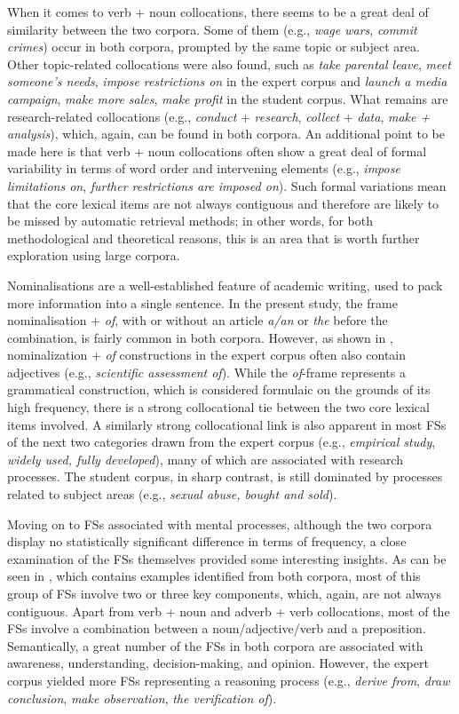 \documentclass[output=paper]{langsci/langscibook}
\begin{document}
When it comes to verb + noun collocations, there seems to be a great deal of similarity between the two corpora. Some of them (e.g., \textit{wage wars}, \textit{commit crimes}) occur in both corpora, prompted by the same topic or subject area. Other topic-related collocations were also found, such as \textit{take parental leave}, \textit{meet someone’s needs}, \textit{impose restrictions on} in the expert corpus and \textit{launch a media campaign}, \textit{make more sales}, \textit{make profit} in the student corpus. What remains are research-related collocations (e.g., \textit{conduct} + \textit{research}, \textit{collect} + \textit{data}, \textit{make + analysis}), which, again, can be found in both corpora. An additional point to be made here is that verb + noun collocations often show a great deal of formal variability in terms of word order and intervening elements (e.g., \textit{impose limitations on}, \textit{further restrictions are imposed on}). Such formal variations mean that the core lexical items are not always contiguous and therefore are likely to be missed by automatic retrieval methods; in other words, for both methodological and theoretical reasons, this is an area that is worth further exploration using large corpora. 

Nominalisations are a well-established feature of academic writing, used to pack more information into a single sentence. In the present study, the frame nominalisation + \textit{of}, with or without an article \textit{a/an} or \textit{the} before the combination, is fairly common in both corpora. However, as shown in , nominalization + \textit{of} constructions in the expert corpus often also contain adjectives (e.g., \textit{scientific assessment of}). While the \textit{of}{}-frame represents a grammatical construction, which is considered formulaic on the grounds of its high frequency, there is a strong collocational tie between the two core lexical items involved. A similarly strong collocational link is also apparent in most FSs of the next two categories drawn from the expert corpus (e.g., \textit{empirical study}, \textit{widely used, fully developed}), many of which are associated with research processes. The student corpus, in sharp contrast, is still dominated by processes related to subject areas (e.g., \textit{sexual abuse, bought and sold}). 

Moving on to FSs associated with mental processes, although the two corpora display no statistically significant difference in terms of frequency, a close examination of the FSs themselves provided some interesting insights. As can be seen in , which contains examples identified from both corpora, most of this group of FSs involve two or three key components, which, again, are not always contiguous. Apart from verb + noun and adverb + verb collocations, most of the FSs involve a combination between a noun/adjective/verb and a preposition. Semantically, a great number of the FSs in both corpora are associated with awareness, understanding, decision-making, and opinion. However, the expert corpus yielded more FSs representing a reasoning process (e.g., \textit{derive from}, \textit{draw conclusion}, \textit{make observation}, \textit{the verification of}).
\end{document}
